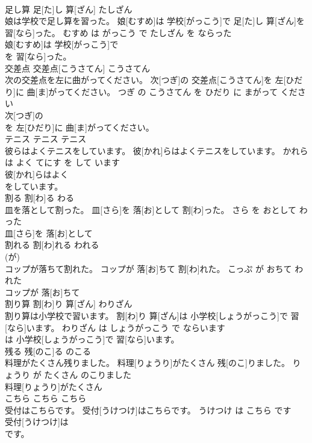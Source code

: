 \documentclass[8pt]{extreport}
\begin{document}
\begin{CJK}{UTF8}{min}
\\	足し算	足[た]し 算[ざん]	たしざん	
\\	娘は学校で足し算を習った。	娘[むすめ]は 学校[がっこう]で 足[た]し 算[ざん]を 習[なら]った。	むすめ は がっこう で たしざん を ならった	
\\	娘[むすめ]は 学校[がっこう]で
\\	を 習[なら]った。		
\\	交差点	交差点[こうさてん]	こうさてん	
\\	次の交差点を左に曲がってください。	次[つぎ]の 交差点[こうさてん]を 左[ひだり]に 曲[ま]がってください。	つぎ の こうさてん を ひだり に まがって ください	
\\	次[つぎ]の
\\	を 左[ひだり]に 曲[ま]がってください。		
\\	テニス	テニス	テニス	
\\	彼らはよくテニスをしています。	彼[かれ]らはよくテニスをしています。	かれら は よく てにす を して います	
\\	彼[かれ]らはよく
\\	をしています。		
\\	割る	割[わ]る	わる	
\\	皿を落として割った。	皿[さら]を 落[お]として 割[わ]った。	さら を おとして わった	
\\	皿[さら]を 落[お]として
\\	割れる	割[わ]れる	われる	
\\	(が)		
\\	コップが落ちて割れた。	コップが 落[お]ちて 割[わ]れた。	こっぷ が おちて われた	
\\	コップが 落[お]ちて
\\	割り算	割[わ]り 算[ざん]	わりざん	
\\	割り算は小学校で習います。	割[わ]り 算[ざん]は 小学校[しょうがっこう]で 習[なら]います。	わりざん は しょうがっこう で ならいます	
\\	は 小学校[しょうがっこう]で 習[なら]います。		
\\	残る	残[のこ]る	のこる	
\\	料理がたくさん残りました。	料理[りょうり]がたくさん 残[のこ]りました。	りょうり が たくさん のこりました	
\\	料理[りょうり]がたくさん
\\	こちら	こちら	こちら	
\\	受付はこちらです。	受付[うけつけ]はこちらです。	うけつけ は こちら です	
\\	受付[うけつけ]は
\\	です。		

\end{CJK}
\end{document}
